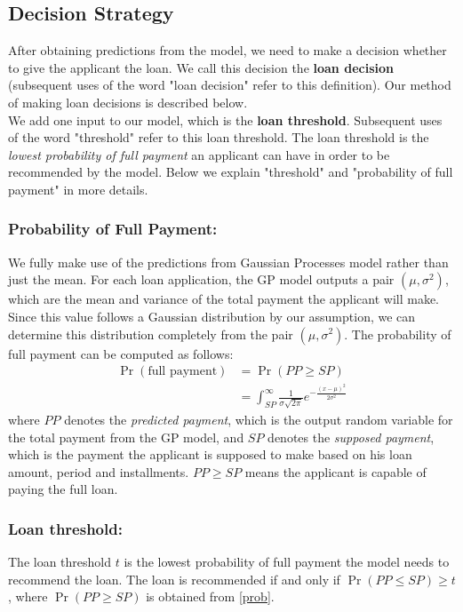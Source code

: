 \documentclass[a4paper]{article}
\theoremstyle{genius}
\begin{document}
\subsection{Decision Strategy} \label{decision strategy}
After obtaining predictions from the model, we need to make a decision whether to give the applicant the loan. We call this decision the \textbf{loan decision} (subsequent uses of the word "loan decision" refer to this definition). Our method of making loan decisions is described below.\\
We add one input to our model, which is the \textbf{loan threshold}. Subsequent uses of the word "threshold" refer to this loan threshold. The loan threshold is the \textit{lowest probability of full payment} an applicant can have in order to be recommended by the model. Below we explain "threshold" and "probability of full payment" in more details.
\subsubsection{Probability of Full Payment:}We fully make use of the predictions from Gaussian Processes model rather than just the mean. For each loan application, the GP model outputs a pair $(\mu, \sigma^2)$, which are the mean and variance of the total payment the applicant will make. Since this value follows a Gaussian distribution by our assumption, we can determine this distribution completely from the pair $(\mu, \sigma^2)$. The probability of full payment can be computed as follows:
\begin{equation} \label{prob}
\begin{aligned}
\Pr(\text{full payment})&  = \Pr(PP \ge SP)\\
& = \int_{SP}^{\infty} \frac{1}{\sigma\sqrt{2\pi}} e^{ -\frac{(x-\mu)^2}{2\sigma^2}}\end{aligned}
\end{equation}
where $PP$ denotes the \textit{predicted payment}, which is the output random variable for the total payment from the GP model, and  $SP$ denotes the \textit{supposed payment}, which is the payment the applicant is supposed to make based on his loan amount, period and installments. $PP \ge SP$ means the applicant is capable of paying the full loan.
\subsubsection{Loan threshold:} The loan threshold $t$ is the lowest probability of full payment the model needs to recommend the loan. The loan is recommended if and only if $\Pr(PP \le SP)\ge t$, where $\Pr(PP \ge SP)$ is obtained from \eqref{prob}.
\end{document}
